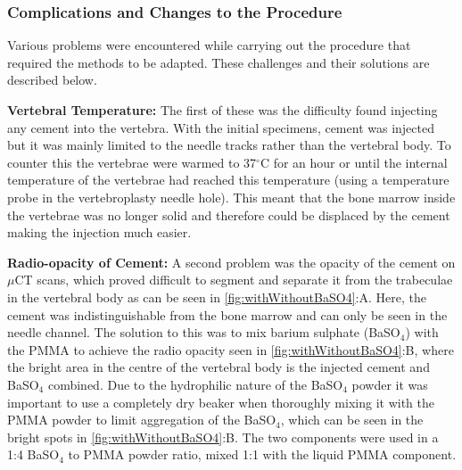 

\subsubsection{Complications and Changes to the Procedure}\label{complications}

Various problems were encountered while carrying out the procedure that
required the methods to be adapted. These challenges and their solutions are
described below.

\textbf{Vertebral Temperature:} The first of these was the difficulty found
injecting any cement into the vertebra. With the initial specimens, cement was
injected but it was mainly limited to the needle tracks rather than the
vertebral body. To counter this the vertebrae were warmed to 37$^\circ$C for an
hour or until the internal temperature of the vertebrae had reached this
temperature (using a temperature probe in the vertebroplasty needle hole). This
meant that the bone marrow inside the vertebrae was no longer solid and
therefore could be displaced by the cement making the injection much easier.

\textbf{Radio-opacity of Cement:} A second problem was the opacity of the
cement on $\mu$CT scans, which proved difficult to segment and separate it from
the trabeculae in the vertebral body as can be seen in
\cref{fig:withWithoutBaSO4}:A. Here, the cement was indistinguishable from the
bone marrow and can only be seen in the needle channel. The solution to this
was to mix barium sulphate (BaSO$_4$) with the PMMA to achieve the radio
opacity seen in \cref{fig:withWithoutBaSO4}:B, where the bright area in the
centre of the vertebral body is the injected cement and BaSO$_4$ combined. Due
to the hydrophilic nature of the BaSO$_4$ powder it was important to use a
completely dry beaker when thoroughly mixing it with the PMMA powder to limit
aggregation of the BaSO$_4$, which can be seen in the bright spots in
\cref{fig:withWithoutBaSO4}:B. The two components were used in a 1:4 BaSO$_4$
to PMMA powder ratio, mixed 1:1 with the liquid PMMA component.

